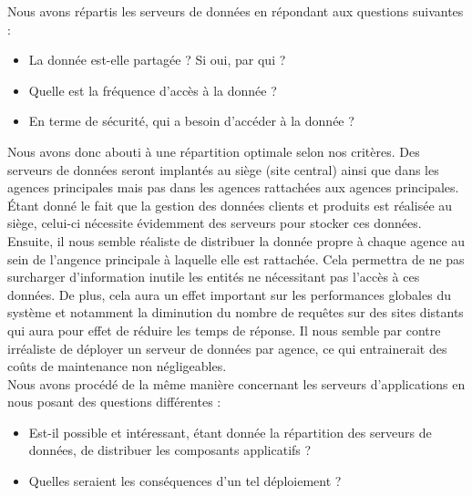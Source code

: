 Nous avons répartis les serveurs de données en répondant aux questions suivantes :\\
\begin{itemize}
	\item[\textbullet] La donnée est-elle partagée ? Si oui, par qui ?
	\item[\textbullet] Quelle est la fréquence d'accès à la donnée ?
	\item[\textbullet] En terme de sécurité, qui a besoin d'accéder à la donnée ?\\
\end{itemize}

Nous avons donc abouti à une répartition optimale selon nos critères. Des serveurs de données seront implantés au siège (site central) ainsi que dans les agences principales mais pas dans les agences rattachées aux agences principales. \'Etant donné le fait que la gestion des données clients et produits est réalisée au siège, celui-ci nécessite évidemment des serveurs pour stocker ces données. Ensuite, il nous semble réaliste de distribuer la donnée propre à chaque agence au sein de l'angence principale à laquelle elle est rattachée. Cela permettra de ne pas surcharger d'information inutile les entités ne nécessitant pas l'accès à ces données. De plus, cela aura un effet important sur les performances globales du système et notamment la diminution du nombre de requêtes sur des sites distants qui aura pour effet de réduire les temps de réponse. Il nous semble par contre irréaliste de déployer un serveur de données par agence, ce qui entrainerait des coûts de maintenance non négligeables.\\

Nous avons procédé de la même manière concernant les serveurs d'applications en nous posant des questions différentes :\\
\begin{itemize}
	\item[\textbullet] Est-il possible et intéressant, étant donnée la répartition des serveurs de données, de distribuer les composants applicatifs ?
	\item[\textbullet] Quelles seraient les conséquences d'un tel déploiement ?\\
\end{itemize}

